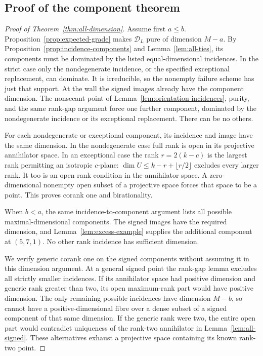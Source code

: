 \subsection{Proof of the component theorem}
\begin{proof}[Proof of Theorem~\ref{thm:all-dimension}]
Assume first $a\le b$. Proposition~\ref{prop:expected-grade} makes
$\mathscr D_L$ pure of dimension $M-a$. By
Proposition~\ref{prop:incidence-components} and Lemma~\ref{lem:all-ties},
its components must be dominated by the listed equal-dimensional
incidences. In the strict case only the nondegenerate incidence, or the
specified exceptional replacement, can dominate. It is irreducible,
so the nonempty failure scheme has just that support. At the wall the
signed images already have the component dimension. The nonsecant
point of Lemma~\ref{lem:orientation-incidences}, purity, and the same
rank-gap argument force one further component, dominated by the
nondegenerate incidence or its exceptional replacement. There can be
no others.

For each nondegenerate or exceptional component, its incidence and
image have the same dimension. In the nondegenerate case full rank is
open in its projective annihilator space. In an exceptional case the
rank $r=2(k-c)$ is the largest rank permitting an isotropic $c$-plane:
$\dim U\le k-r+\lfloor r/2\rfloor$ excludes every larger rank.
It too is an open rank condition in the annihilator space. A
zero-dimensional nonempty open subset of a projective space forces that
space to be a point. This proves corank one and birationality.

When $b<a$, the same incidence-to-component argument lists all possible
maximal-dimensional components. The signed images have the required
dimension, and Lemma~\ref{lem:excess-example} supplies the additional
component at $(5,7,1)$. No other rank incidence has sufficient dimension.

We verify generic corank one on the signed components without assuming
it in this dimension argument. At a general signed point the rank-gap
lemma excludes all strictly smaller incidences. If its annihilator
space had positive dimension and generic rank greater than two, its
open maximum-rank part would have positive dimension. The only
remaining possible incidences have dimension $M-b$, so cannot have a
positive-dimensional fibre over a dense subset of a signed component
of that same dimension. If the generic rank were two, the entire open
part would contradict uniqueness of the rank-two annihilator in
Lemma~\ref{lem:all-signed}. These alternatives exhaust a projective
space containing its known rank-two point.


\end{proof}
